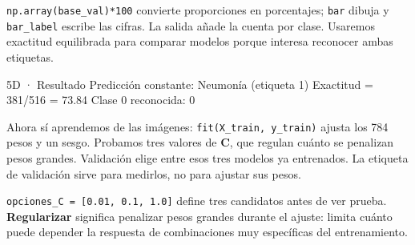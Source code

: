 \texttt{\small np.\allowbreak{}array(\allowbreak{}base\_\allowbreak{}val)\allowbreak{}*100} convierte proporciones en porcentajes; \texttt{\small bar} dibuja y \texttt{\small bar\_\allowbreak{}label} escribe las cifras. La salida añade la cuenta por clase. Usaremos exactitud equilibrada para comparar modelos porque interesa reconocer ambas etiquetas.




\begin{Salida}{5D · Resultado}
Predicción constante: Neumonía (etiqueta 1)
Exactitud = 381/516 = 73.84%
Clase 0 reconocida: 0%
\end{Salida}

\label{bloque-6}

Ahora sí aprendemos de las imágenes: \texttt{\small fit(\allowbreak{}X\_\allowbreak{}train,\allowbreak{} y\_\allowbreak{}train)\allowbreak{}} ajusta los 784 pesos y un sesgo. Probamos tres valores de \textbf{C}, que regulan cuánto se penalizan pesos grandes. Validación elige entre esos tres modelos ya entrenados. La etiqueta de validación sirve para medirlos, no para ajustar sus pesos.


\label{paso-6a}

\texttt{\small opciones\_\allowbreak{}C =\allowbreak{} [\allowbreak{}0.\allowbreak{}01,\allowbreak{} 0.\allowbreak{}1,\allowbreak{} 1.\allowbreak{}0]\allowbreak{}} define tres candidatos antes de ver prueba. \textbf{Regularizar} significa penalizar pesos grandes durante el ajuste: limita cuánto puede depender la respuesta de combinaciones muy específicas del entrenamiento.

